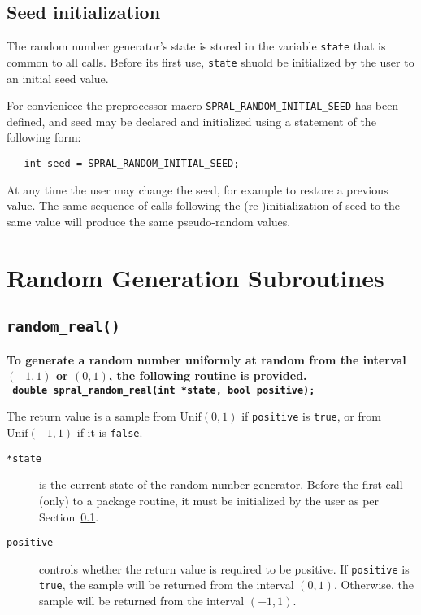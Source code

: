 \subsection{Seed initialization}
\label{random: seed initialization}
The random number generator's state is stored in the variable {\tt state} that
is common to all calls. Before its first use, {\tt state} shuold be initialized
by the user to an initial seed value.

For convieniece the preprocessor macro \texttt{SPRAL\_RANDOM\_INITIAL\_SEED} has
been defined, and seed may be declared and initialized using a statement of the
following form:
\begin{verbatim}
   int seed = SPRAL_RANDOM_INITIAL_SEED;
\end{verbatim}

At any time the user may change the seed, for example to restore a previous
value. The same sequence of calls following the (re-)initialization of seed to
the same value will produce the same pseudo-random values.


\section{Random Generation Subroutines}


\subsection{\texttt{random\_real()}}

\textbf{\noindent
   To generate a random number uniformly at random from the interval $(-1,1)$ or $(0,1)$, the following routine is provided.
   \vspace*{0.1cm} \\
   \texttt{ \hspace*{0.2cm}
      double spral\_random\_real(int *state, bool positive);
   }
   \vspace{0.3cm}
}

\noindent
The return value is a sample from $\mathrm{Unif}(0,1)$ if {\tt positive} is
{\tt true}, or from $\mathrm{Unif}(-1,1)$ if it is {\tt false}.

\begin{description}

\item[\texttt{*state}] is the current state of the random number generator.
   Before the first call (only) to a package routine, it must be initialized by
   the user as per Section~\ref{random: seed initialization}.

\item[\texttt{positive}] controls whether the return value is required to be
   positive. If \texttt{positive} is \texttt{true}, the sample will be returned
   from the interval $(0,1)$. Otherwise, the sample will be returned from the
   interval $(-1,1)$.

\end{description}

